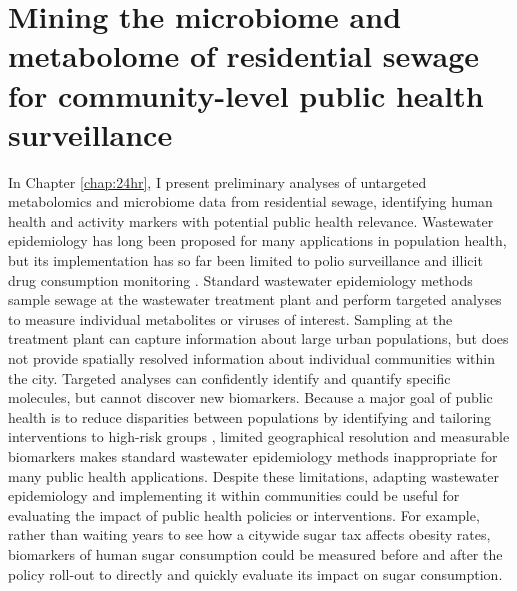 \section{Mining the microbiome and metabolome of residential sewage for community-level public health surveillance}

In Chapter \ref{chap:24hr}, I present preliminary analyses of untargeted metabolomics and microbiome data from residential sewage, identifying human health and activity markers with potential public health relevance.
Wastewater epidemiology has long been proposed for many applications in population health, but its implementation has so far been limited to polio surveillance \cite{polio} and illicit drug consumption monitoring \cite{Subedi2014,Ort2014}.
Standard wastewater epidemiology methods sample sewage at the wastewater treatment plant and perform targeted analyses to measure individual metabolites or viruses of interest.
Sampling at the treatment plant can capture information about large urban populations, but does not provide spatially resolved information about individual communities within the city.
Targeted analyses can confidently identify and quantify specific molecules, but cannot discover new biomarkers.
Because a major goal of public health is to reduce disparities between populations by identifying and tailoring interventions to high-risk groups \cite{Ramaswami2018,Weeramanthri2018,Khoury2016}, limited geographical resolution and measurable biomarkers makes standard wastewater epidemiology methods inappropriate for many public health applications.
Despite these limitations, adapting wastewater epidemiology and implementing it within communities could be useful for evaluating the impact of public health policies or interventions.
For example, rather than waiting years to see how a citywide sugar tax affects obesity rates, biomarkers of human sugar consumption could be measured before and after the policy roll-out to directly and quickly evaluate its impact on sugar consumption.

